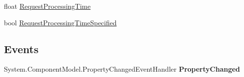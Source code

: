 \begin{DoxyCompactItemize}
\begin{DoxyCompactList}\small\item\em \end{DoxyCompactList}\item 
\hypertarget{class_price___comparison_1_1amazon_1_1ecs_1_1_operation_request_a716a643f1dde863d4a39d071d7f110c3}{float \hyperlink{class_price___comparison_1_1amazon_1_1ecs_1_1_operation_request_a716a643f1dde863d4a39d071d7f110c3}{Request\-Processing\-Time}}\label{class_price___comparison_1_1amazon_1_1ecs_1_1_operation_request_a716a643f1dde863d4a39d071d7f110c3}

\begin{DoxyCompactList}\small\item\em \end{DoxyCompactList}\item 
\hypertarget{class_price___comparison_1_1amazon_1_1ecs_1_1_operation_request_a83ee647cb97a26514df46347ee5a016f}{bool \hyperlink{class_price___comparison_1_1amazon_1_1ecs_1_1_operation_request_a83ee647cb97a26514df46347ee5a016f}{Request\-Processing\-Time\-Specified}}\label{class_price___comparison_1_1amazon_1_1ecs_1_1_operation_request_a83ee647cb97a26514df46347ee5a016f}

\begin{DoxyCompactList}\small\item\em \end{DoxyCompactList}\end{DoxyCompactItemize}
\subsection*{Events}
\begin{DoxyCompactItemize}
\item 
\hypertarget{class_price___comparison_1_1amazon_1_1ecs_1_1_operation_request_a55f7a642c81871c53e7872ef0a25e77e}{System.\-Component\-Model.\-Property\-Changed\-Event\-Handler {\bfseries Property\-Changed}}\label{class_price___comparison_1_1amazon_1_1ecs_1_1_operation_request_a55f7a642c81871c53e7872ef0a25e77e}

\end{DoxyCompactItemize}
